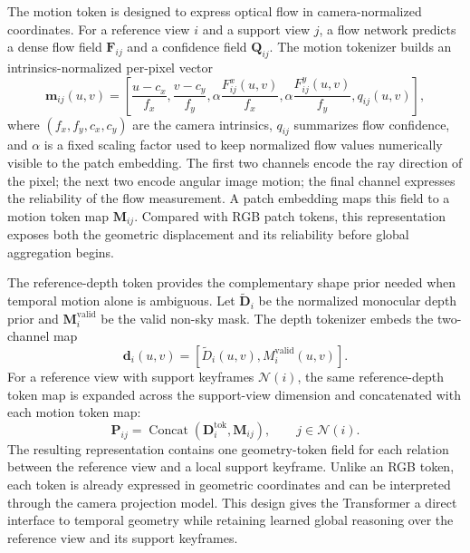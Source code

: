 The motion token is designed to express optical flow in camera-normalized coordinates.
For a reference view $i$ and a support view $j$, a flow network predicts a dense flow field $\bm{F}_{ij}$ and a confidence field $\bm{Q}_{ij}$.
The motion tokenizer builds an intrinsics-normalized per-pixel vector
\begin{equation}
    \bm{m}_{ij}(u,v)
    =
    \left[
    \frac{u-c_x}{f_x},
    \frac{v-c_y}{f_y},
    \alpha\frac{F^x_{ij}(u,v)}{f_x},
    \alpha\frac{F^y_{ij}(u,v)}{f_y},
    q_{ij}(u,v)
    \right],
    \label{eq:geont_motion_token_input}
\end{equation}
where $(f_x,f_y,c_x,c_y)$ are the camera intrinsics, $q_{ij}$ summarizes flow confidence, and $\alpha$ is a fixed scaling factor used to keep normalized flow values numerically visible to the patch embedding.
The first two channels encode the ray direction of the pixel; the next two encode angular image motion; the final channel expresses the reliability of the flow measurement.
A patch embedding maps this field to a motion token map $\bm{M}_{ij}$.
Compared with RGB patch tokens, this representation exposes both the geometric displacement and its reliability before global aggregation begins.

The reference-depth token provides the complementary shape prior needed when temporal motion alone is ambiguous.
Let $\tilde{\bm{D}}_i$ be the normalized monocular depth prior and $\bm{M}_i^{\mathrm{valid}}$ be the valid non-sky mask.
The depth tokenizer embeds the two-channel map
\begin{equation}
    \bm{d}_i(u,v)
    =
    \left[
    \tilde{D}_i(u,v),
    M_i^{\mathrm{valid}}(u,v)
    \right].
    \label{eq:geont_depth_token_input}
\end{equation}
For a reference view with support keyframes $\mathcal{N}(i)$, the same reference-depth token map is expanded across the support-view dimension and concatenated with each motion token map:
\begin{equation}
    \bm{P}_{ij}
    =
    \operatorname{Concat}\left(\bm{D}_i^{\mathrm{tok}}, \bm{M}_{ij}\right),
    \qquad j \in \mathcal{N}(i).
    \label{eq:geont_patch_token}
\end{equation}
The resulting representation contains one geometry-token field for each relation between the reference view and a local support keyframe.
Unlike an RGB token, each token is already expressed in geometric coordinates and can be interpreted through the camera projection model.
This design gives the Transformer a direct interface to temporal geometry while retaining learned global reasoning over the reference view and its support keyframes.

